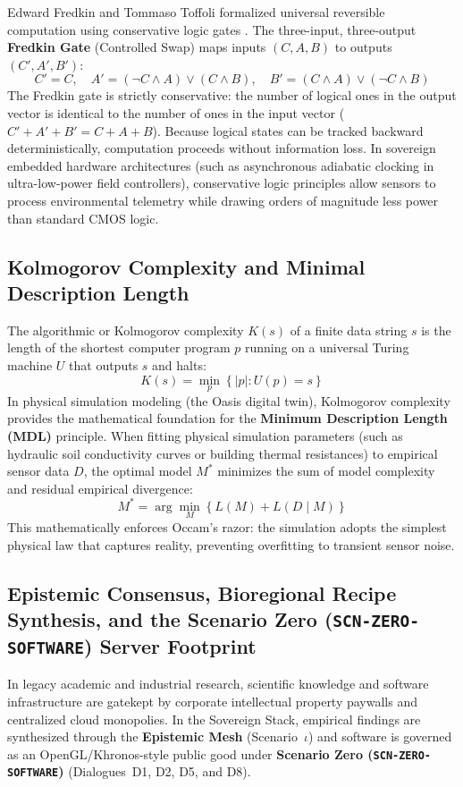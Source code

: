 Edward Fredkin and Tommaso Toffoli formalized universal reversible computation using conservative logic gates \cite{fredkin1982conservative}. The three-input, three-output \textbf{Fredkin Gate} (Controlled Swap) maps inputs $(C, A, B)$ to outputs $(C', A', B')$:
\begin{equation}
C' = C, \quad A' = (\neg C \land A) \lor (C \land B), \quad B' = (C \land A) \lor (\neg C \land B)
\label{eq:fredkin_gate}
\end{equation}
The Fredkin gate is strictly conservative: the number of logical ones in the output vector is identical to the number of ones in the input vector ($C' + A' + B' = C + A + B$). Because logical states can be tracked backward deterministically, computation proceeds without information loss. In sovereign embedded hardware architectures (such as asynchronous adiabatic clocking in ultra-low-power field controllers), conservative logic principles allow sensors to process environmental telemetry while drawing orders of magnitude less power than standard CMOS logic.

\subsection{Kolmogorov Complexity and Minimal Description Length}
The algorithmic or Kolmogorov complexity $K(s)$ of a finite data string $s$ is the length of the shortest computer program $p$ running on a universal Turing machine $U$ that outputs $s$ and halts:
\begin{equation}
K(s) = \min_{p} \left\{ |p| : U(p) = s \right\}
\label{eq:kolmogorov_complexity}
\end{equation}
In physical simulation modeling (the Oasis digital twin), Kolmogorov complexity provides the mathematical foundation for the \textbf{Minimum Description Length (MDL)} principle. When fitting physical simulation parameters (such as hydraulic soil conductivity curves or building thermal resistances) to empirical sensor data $D$, the optimal model $M^*$ minimizes the sum of model complexity and residual empirical divergence:
\begin{equation}
M^* = \arg\min_{M} \left\{ L(M) + L(D \mid M) \right\}
\label{eq:mdl_principle}
\end{equation}
This mathematically enforces Occam's razor: the simulation adopts the simplest physical law that captures reality, preventing overfitting to transient sensor noise.

\subsection{Epistemic Consensus, Bioregional Recipe Synthesis, and the Scenario Zero (\texttt{SCN-ZERO-SOFTWARE}) Server Footprint}
\label{subsec:info_scenario_zero_footprint}
In legacy academic and industrial research, scientific knowledge and software infrastructure are gatekept by corporate intellectual property paywalls and centralized cloud monopolies. In the Sovereign Stack, empirical findings are synthesized through the \textbf{Epistemic Mesh} (Scenario~$\iota$) and software is governed as an OpenGL/Khronos-style public good under \textbf{Scenario Zero (\texttt{SCN-ZERO-SOFTWARE})} (Dialogues~D1, D2, D5, and D8).

